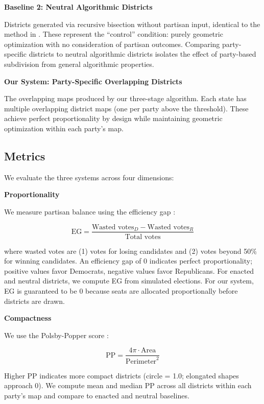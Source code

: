 \textbf{Baseline 2: Neutral Algorithmic Districts}

Districts generated via recursive bisection without partisan input, identical to the method in \citet{author2024recursive}. These represent the ``control'' condition: purely geometric optimization with no consideration of partisan outcomes. Comparing party-specific districts to neutral algorithmic districts isolates the effect of party-based subdivision from general algorithmic properties.

\textbf{Our System: Party-Specific Overlapping Districts}

The overlapping maps produced by our three-stage algorithm. Each state has multiple overlapping district maps (one per party above the threshold). These achieve perfect proportionality by design while maintaining geometric optimization within each party's map.

\subsection{Metrics}

We evaluate the three systems across four dimensions:

\textbf{Proportionality}

We measure partisan balance using the efficiency gap \citep{stephanopoulos2015partisan}:

\begin{equation}
\text{EG} = \frac{\text{Wasted votes}_D - \text{Wasted votes}_R}{\text{Total votes}}
\end{equation}

where wasted votes are (1) votes for losing candidates and (2) votes beyond 50\% for winning candidates. An efficiency gap of 0 indicates perfect proportionality; positive values favor Democrats, negative values favor Republicans. For enacted and neutral districts, we compute EG from simulated elections. For our system, EG is guaranteed to be 0 because seats are allocated proportionally before districts are drawn.

\textbf{Compactness}

We use the Polsby-Popper score \citep{polsby1991third}:

\begin{equation}
\text{PP} = \frac{4\pi \cdot \text{Area}}{\text{Perimeter}^2}
\end{equation}

Higher PP indicates more compact districts (circle = 1.0; elongated shapes approach 0). We compute mean and median PP across all districts within each party's map and compare to enacted and neutral baselines.

